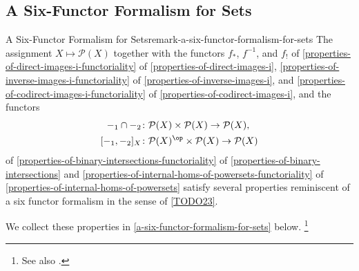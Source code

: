 \subsection{A Six-Functor Formalism for Sets}\label{subsection-a-six-functor-formalism-for-sets}
\begin{remark}{A Six-Functor Formalism for Sets}{remark-a-six-functor-formalism-for-sets}%
    The assignment $X\mapsto\mathcal{P}(X)$ together with the functors $f_{*}$, $f^{-1}$, and $f_{!}$ of \cref{properties-of-direct-images-i-functoriality} of \cref{properties-of-direct-images-i}, \cref{properties-of-inverse-images-i-functoriality} of \cref{properties-of-inverse-images-i}, and \cref{properties-of-codirect-images-i-functoriality} of \cref{properties-of-codirect-images-i}, and the functors
    \begin{align*}
        -_{1}\cap-_{2}    &\colon \mathcal{P}(X)\times\mathcal{P}(X) \to \mathcal{P}(X),\\
        [-_{1},-_{2}]_{X} &\colon \mathcal{P}(X)^{\op}\times\mathcal{P}(X) \to \mathcal{P}(X)
    \end{align*}
    of \cref{properties-of-binary-intersections-functoriality} of \cref{properties-of-binary-intersections} and \cref{properties-of-internal-homs-of-powersets-functoriality} of \cref{properties-of-internal-homs-of-powersets} satisfy several properties reminiscent of a six functor formalism in the sense of \cref{TODO23}.

    \indent We collect these properties in \cref{a-six-functor-formalism-for-sets} below.%
    \footnote{%
        See also \cite{nlab:interactions-of-images-and-pre-images-with-unions-and-intersections}.
        \par\vspace*{\TCBBoxCorrection}
    }%
\end{remark}
